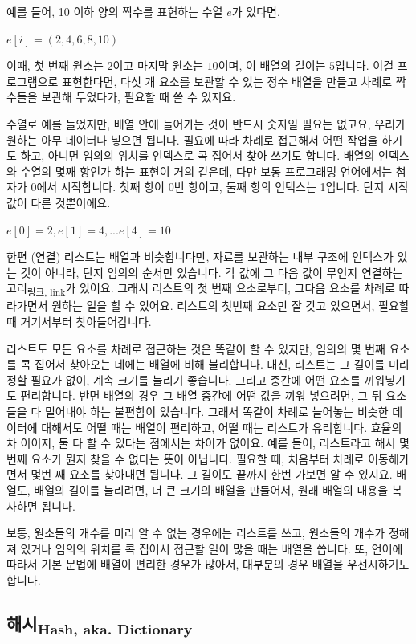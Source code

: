 \documentclass[11pt,a4paper]{article}
\newcommand{\sub}[1]{\textsubscript{#1}}
\begin{document}
예를 들어, \textsf{10 이하 양의 짝수}를 표현하는 수열 $e$가 있다면,

    $ e[i] = (2, 4, 6, 8, 10) $

이때, 첫 번째 원소는 $2$이고 마지막 원소는 $10$이며, 이 배열의 길이는 $5$입니다. 이걸 프로그램으로 표현한다면, 다섯 개 요소를 보관할 수 있는 정수 배열을 만들고 차례로 짝수들을 보관해 두었다가, 필요할 때 쓸 수 있지요.

수열로 예를 들었지만, 배열 안에 들어가는 것이 반드시 숫자일 필요는 없고요, 우리가 원하는 아무 데이터나 넣으면 됩니다. 필요에 따라 차례로 접근해서 어떤 작업을 하기도 하고, 아니면 임의의 위치를 인덱스로 콕 집어서 찾아 쓰기도 합니다. 배열의 인덱스와 수열의 몇째 항인가 하는 표현이 거의 같은데, 다만 보통 프로그래밍 언어에서는 첨자가 $0$에서 시작합니다. 첫째 항이 $0$번 항이고, 둘째 항의 인덱스는 1입니다. 단지 시작 값이 다른 것뿐이에요.

    $ e[0] = 2, e[1] = 4, ... e[4] = 10 $

한편 (연결) 리스트는 배열과 비슷합니다만, 자료를 보관하는 내부 구조에 인덱스가 있는 것이 아니라, 단지 임의의 순서만 있습니다. 각 값에 그 다음 값이 무언지 연결하는 고리\sub{링크, link}가 있어요. 그래서 리스트의 첫 번째 요소로부터, 그다음 요소를 차례로 따라가면서 원하는 일을 할 수 있어요. 리스트의 첫번째 요소만 잘 갖고 있으면서, 필요할 때 거기서부터 찾아들어갑니다.

리스트도 모든 요소를 차례로 접근하는 것은 똑같이 할 수 있지만, 임의의 몇 번째 요소를 콕 집어서 찾아오는 데에는 배열에 비해 불리합니다. 대신, 리스트는 그 길이를 미리 정할 필요가 없이, 계속 크기를 늘리기 좋습니다. 그리고 중간에 어떤 요소를 끼워넣기도 편리합니다. 반면 배열의 경우 그 배열 중간에 어떤 값을 끼워 넣으려면, 그 뒤 요소들을 다 밀어내야 하는 불편함이 있습니다. 그래서 똑같이 차례로 늘어놓는 비슷한 데이터에 대해서도 어떨 때는 배열이 편리하고, 어떨 때는 리스트가 유리합니다. 효율의 차 이이지, 둘 다 할 수 있다는 점에서는 차이가 없어요. 예를 들어, 리스트라고 해서 몇 번째 요소가 뭔지 찾을 수 없다는 뜻이 아닙니다. 필요할 때, 처음부터 차례로 이동해가면서 몇번 째 요소를 찾아내면 됩니다. 그 길이도 끝까지 한번 가보면 알 수 있지요. 배열도, 배열의 길이를 늘리려면, 더 큰 크기의 배열을 만들어서, 원래 배열의 내용을 복사하면 됩니다.

보통, 원소들의 개수를 미리 알 수 없는 경우에는 리스트를 쓰고, 원소들의 개수가 정해져 있거나 임의의 위치를 콕 집어서 접근할 일이 많을 때는 배열을 씁니다. 또, 언어에 따라서 기본 문법에 배열이 편리한 경우가 많아서, 대부분의 경우 배열을 우선시하기도 합니다.

\subsection[해시]{해시\sub{Hash, aka. Dictionary}}
\end{document}
